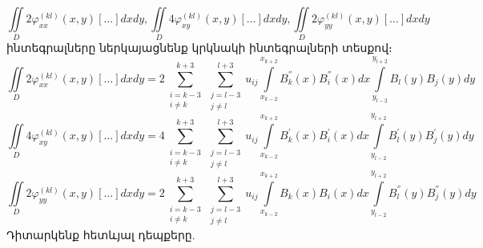 \documentclass[fleqn, bachelor,subf,12pt,notitlepage]{article}
\begin{document}
		$$\iint \limits_{D} 2\varphi_{xx}^{(kl)}(x,y)[\dots]dxdy, \iint \limits_{D} 4\varphi_{xy}^{(kl)}(x,y)[\dots]dxdy, \iint \limits_{D} 2\varphi_{yy}^{(kl)}(x,y)[\dots]dxdy$$
ինտեգրալները ներկայացնենք կրկնակի ինտեգրալների տեսքով։
\begin{equation}
\iint \limits_{D} 2\varphi_{xx}^{(kl)}(x,y)[\dots]dxdy= 2\sum_{\substack{i=k-3\\ i \neq k}}^{k+3}\sum_{\substack{j=l-3\\ j \neq l}}^{l+3} u_{ij}\int \limits_{x_{k-2}}^{x_{k+2}}B_{k}^{''}(x)B_{i}^{''}(x)dx \int \limits_{y_{l-2}}^{y_{l+2}}B_{l}(y)B_{j}(y)dy
\end{equation}
\begin{equation}
\iint \limits_{D} 4\varphi_{xy}^{(kl)}(x,y)[\dots]dxdy= 4\sum_{\substack{i=k-3\\ i \neq k}}^{k+3}\sum_{\substack{j=l-3\\ j \neq l}}^{l+3}u_{ij}\int \limits_{x_{k-2}}^{x_{k+2}}B_{k}^{'}(x)B_{i}^{'}(x)dx \int \limits_{y_{l-2}}^{y_{l+2}}B_{l}^{'}(y)B_{j}^{'}(y)dy
\end{equation}
\begin{equation}
\iint \limits_{D} 2\varphi_{yy}^{(kl)}(x,y)[\dots]dxdy= 2\sum_{\substack{i=k-3\\ i \neq k}}^{k+3}\sum_{\substack{j=l-3\\ j \neq l}}^{l+3}u_{ij}\int \limits_{x_{k-2}}^{x_{k+2}}B_{k}(x)B_{i}(x)dx \int \limits_{y_{l-2}}^{y_{l+2}}B_{l}^{''}(y)B_{j}^{''}(y)dy
\end{equation}
\newpage
Դիտարկենք  հետևյալ դեպքերը.
\end{document}

